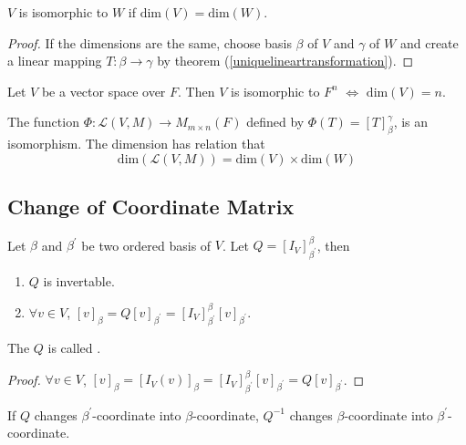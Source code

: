 \begin{theorem}
	$V$ is isomorphic to $W$ if $\text{dim}(V) = \text{dim}(W)$.
\end{theorem}

\begin{proof}
	If the dimensions are the same, choose basis $\beta$ of $V$ and $\gamma$ of $W$ and create a linear mapping $T:\beta \rightarrow \gamma$ by theorem (\ref{uniquelineartransformation}).
\end{proof}


\begin{theorem}
	Let $V$ be a vector space over $F$. Then $V$ is isomorphic to $F^n$ $\Leftrightarrow$ $\text{dim}(V) = n$.
\end{theorem}


\begin{theorem}
	The function $\Phi: \mathcal{L}(V,M) \rightarrow M_{m \times n}(F)$ defined by $\Phi (T) = [T]_\beta^\gamma$, is an isomorphism. The dimension has relation that 
	\begin{equation}
		\text{dim}(\mathcal{L}(V,M)) = \text{dim}(V) \times \text{dim}(W)
	\end{equation}
\end{theorem}


\subsection{Change of Coordinate Matrix}


\begin{theorem}
	Let $\beta$ and $\beta^\prime$ be two ordered basis of $V$. Let $Q = [I_V]_{\beta^\prime}^\beta$, then
	\begin{enumerate}
		\item $Q$ is invertable.
		\item $\forall v \in V$, $[v]_\beta = Q [v]_{\beta^\prime} = [I_V]_{\beta^\prime}^\beta [v]_{\beta^\prime}$.
	\end{enumerate}
	
	The $Q$ is called .
\end{theorem}

\begin{proof}
    $\forall v \in V $,  $[v]_\beta = [I_V (v)]_\beta =  [I_V]_{\beta^\prime}^\beta [v]_{\beta^\prime} = Q [v]_{\beta^\prime}$.
\end{proof}

If $Q$ changes $\beta^\prime$-coordinate into $\beta$-coordinate, $Q^{-1}$ changes $\beta$-coordinate into $\beta^\prime$-coordinate.

